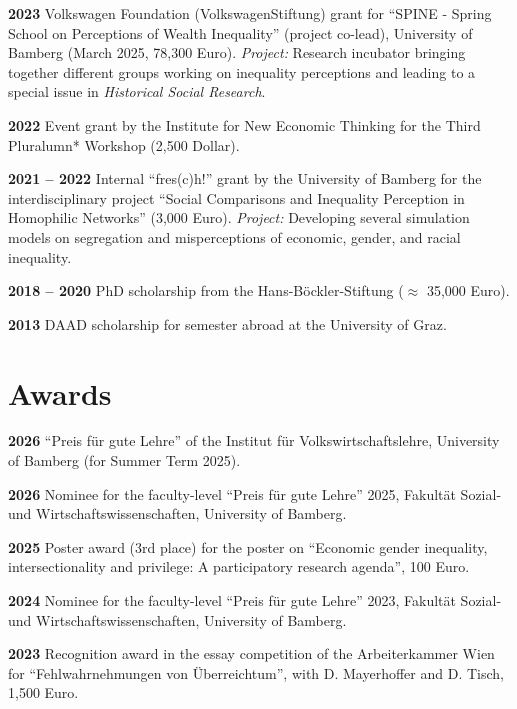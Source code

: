 \documentclass[margin]{res}
\begin{document}
\begin{resume}
	\textbf{2023} Volkswagen Foundation (VolkswagenStiftung) grant for ``SPINE - Spring School on Perceptions of Wealth Inequality'' (project co-lead), University of Bamberg (March 2025, 78,300 Euro). \textit{Project:} Research incubator bringing together different groups working on inequality perceptions and leading to a special issue in \textit{Historical Social Research}.
	
	\textbf{2022} Event grant by the Institute for New Economic Thinking for the Third Pluralumn* Workshop (2,500 Dollar).
	
	\textbf{2021 -- 2022} Internal ``fres(c)h!'' grant by the University of Bamberg for the interdisciplinary project ``Social Comparisons and Inequality Perception in Homophilic Networks'' (3,000 Euro). \textit{Project:} Developing several simulation models on segregation and misperceptions of economic, gender, and racial inequality.
	
	\textbf{2018 -- 2020} PhD scholarship from the Hans-B\"ockler-Stiftung ($\approx$ 35,000 Euro).
	
	\textbf{2013} DAAD scholarship for semester abroad at the University of Graz.\\
	
	\section{Awards}
	\textbf{2026} ``Preis f\"ur gute Lehre'' of the Institut f\"ur Volkswirtschaftslehre, University of Bamberg (for Summer Term 2025).
	
	\textbf{2026} Nominee for the faculty-level ``Preis f\"ur gute Lehre'' 2025, Fakult\"at Sozial- und Wirtschaftswissenschaften, University of Bamberg.
	
	\textbf{2025} Poster award (3rd place) for the poster on ``Economic gender inequality, intersectionality and privilege: A participatory research agenda'', 100 Euro.
	
	\textbf{2024} Nominee for the faculty-level ``Preis f\"ur gute Lehre'' 2023, Fakult\"at Sozial- und Wirtschaftswissenschaften, University of Bamberg.
	
	\textbf{2023} Recognition award in the essay competition of the Arbeiterkammer Wien for ``Fehlwahrnehmungen von \"Uberreichtum'', with D. Mayerhoffer and D. Tisch, 1,500 Euro.
	

\end{resume}
\end{document}
